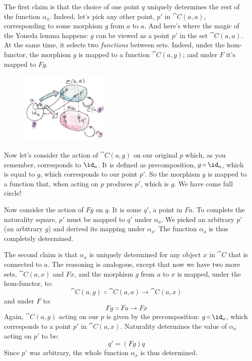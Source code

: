 \noindent
The first claim is that the choice of one point $q$ uniquely
determines the rest of the function $\alpha_a$. Indeed, let's pick any
other point, $p'$ in $\cat{C}(a, a)$, corresponding to
some morphism $g$ from $a$ to $a$. And here's where
the magic of the Yoneda lemma happens: $g$ can be viewed as a
point $p'$ in the set $\cat{C}(a, a)$. At the same time,
it selects two \emph{functions} between sets. Indeed, under the
hom-functor, the morphism $g$ is mapped to a function
$\cat{C}(a, g)$; and under $F$ it's mapped to $F g$.

\begin{figure}[H]
\centering
\includegraphics[width=0.4\textwidth]{images/yoneda4.png}
\end{figure}

\noindent
Now let's consider the action of $\cat{C}(a, g)$ on our original
$p$ which, as you remember, corresponds to $\id_a$. It is
defined as precomposition, $g \circ \id_a$, which is equal to $g$,
which corresponds to our point $p'$. So the morphism
$g$ is mapped to a function that, when acting on $p$
produces $p'$, which is $g$. We have come full
circle!

Now consider the action of $F g$ on $q$. It is some
$q'$, a point in $F a$. To complete the naturality
square, $p'$ must be mapped to $q'$ under
$\alpha_a$. We picked an arbitrary $p'$ (an arbitrary
$g$) and derived its mapping under $\alpha_a$. The function
$\alpha_a$ is thus completely determined.

The second claim is that $\alpha_x$ is uniquely determined for any
object $x$ in $\cat{C}$ that is connected to $a$. The
reasoning is analogous, except that now we have two more sets,
$\cat{C}(a, x)$ and $F x$, and the morphism $g$ from
$a$ to $x$ is mapped, under the hom-functor, to:
\[\cat{C}(a, g) \Colon \cat{C}(a, a) \to \cat{C}(a, x)\]
and under $F$ to:
\[F g \Colon F a \to F x\]
Again, $\cat{C}(a, g)$ acting on our $p$ is given by the
precomposition: $g \circ \id_a$, which corresponds to a point
$p'$ in $\cat{C}(a, x)$. Naturality determines the value
of $\alpha_x$ acting on $p'$ to be:
\[q' = (F g) q\]
Since $p'$ was arbitrary, the whole function $\alpha_x$ is
thus determined.

